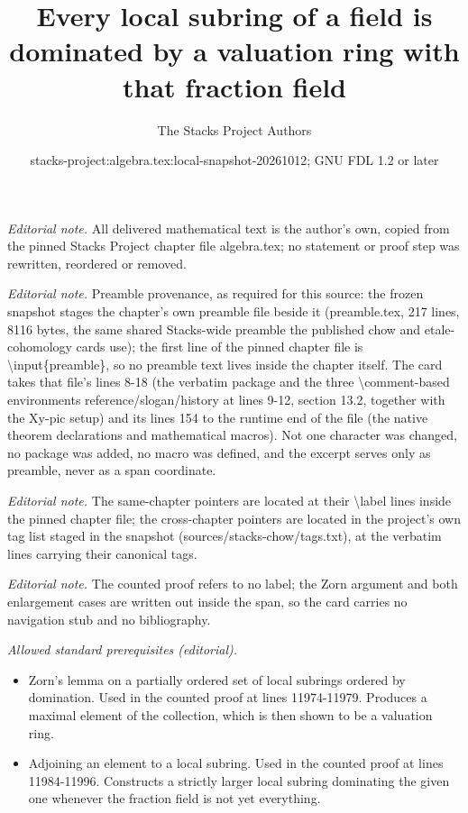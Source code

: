 \documentclass[10pt,a4paper]{amsart}
\title{Every local subring of a field is dominated by a valuation ring with that fraction field}
\author{The Stacks Project Authors}
\date{stacks-project:algebra.tex:local-snapshot-20261012; GNU FDL 1.2 or later}
\theoremstyle{plain}
\theoremstyle{definition}
\theoremstyle{remark}
\numberwithin{equation}{subsection}
\begin{document}
\maketitle
\noindent\textit{Editorial note.} All delivered mathematical text is the author's own, copied from the pinned Stacks Project chapter file algebra.tex; no statement or proof step was rewritten, reordered or removed.\par\medskip
\noindent\textit{Editorial note.} Preamble provenance, as required for this source: the frozen snapshot stages the chapter's own preamble file beside it (preamble.tex, 217 lines, 8116 bytes, the same shared Stacks-wide preamble the published chow and etale-cohomology cards use); the first line of the pinned chapter file is \textbackslash{}input\{preamble\}, so no preamble text lives inside the chapter itself. The card takes that file's lines 8-18 (the verbatim package and the three \textbackslash{}comment-based environments reference/slogan/history at lines 9-12, section 13.2, together with the Xy-pic setup) and its lines 154 to the runtime end of the file (the native theorem declarations and mathematical macros). Not one character was changed, no package was added, no macro was defined, and the excerpt serves only as preamble, never as a span coordinate.\par\medskip
\noindent\textit{Editorial note.} The same-chapter pointers are located at their \textbackslash{}label lines inside the pinned chapter file; the cross-chapter pointers are located in the project's own tag list staged in the snapshot (sources/stacks-chow/tags.txt), at the verbatim lines carrying their canonical tags.\par\medskip
\noindent\textit{Editorial note.} The counted proof refers to no label; the Zorn argument and both enlargement cases are written out inside the span, so the card carries no navigation stub and no bibliography.\par\medskip
\noindent\textit{Allowed standard prerequisites (editorial).}\begin{itemize}
\item Zorn's lemma on a partially ordered set of local subrings ordered by domination. Used in the counted proof at lines 11974-11979. Produces a maximal element of the collection, which is then shown to be a valuation ring.
\item Adjoining an element to a local subring. Used in the counted proof at lines 11984-11996. Constructs a strictly larger local subring dominating the given one whenever the fraction field is not yet everything.
\end{itemize}\medskip
\end{document}
